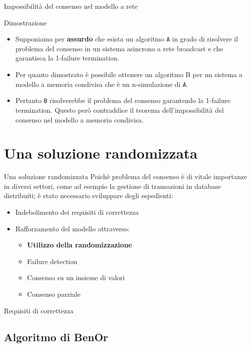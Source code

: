 \documentclass{beamer}
\begin{document}
\begin{frame}{Impossibilità del consenso nel modello a rete}
    \begin{block}{Dimostrazione}
    \begin{itemize}
        \item Supponiamo per \textbf{assurdo} che esista un algoritmo \texttt{A} in grado di risolvere il problema del consenso in un sistema asincrono a rete broadcast e che garantisca la 1-failure termination. 
        \item Per quanto dimostrato è possibile ottenere un algoritmo B per un sistema a modello a memoria condivisa che è un n-simulazione di \texttt{A}. 
        \item Pertanto \texttt{B} risolverebbe il problema del consenso garantendo la 1-failure termination. Questo però contraddice il teorema dell'impossibilità del consenso nel modello a memoria condivisa. 
    \end{itemize}
    \end{block}
\end{frame}


\section{Una soluzione randomizzata}

\begin{frame}{Una soluzione randomizzata}
    Poichè problema del consenso è di vitale importanze in diversi settori, come ad esempio la gestione di transazioni in database distribuiti; è stato necessario sviluppare degli espedienti:
    \vspace{0.2cm}
    \begin{itemize}
        \item Indebolimento dei requisiti di correttezza
        \item Rafforzamento del modello attraverso: 
        \vspace{0.2cm}
        \begin{itemize}
            \item \textbf{Utilizzo della randomizzazione}
            \item Failure detection
            \item Consenso su un insieme di valori
            \item Consenso parziale
        \end{itemize}
    \end{itemize}
\end{frame}

\begin{frame}{Requisiti di correttezza}

\end{frame}

\subsection{Algoritmo di BenOr}
\end{document}
